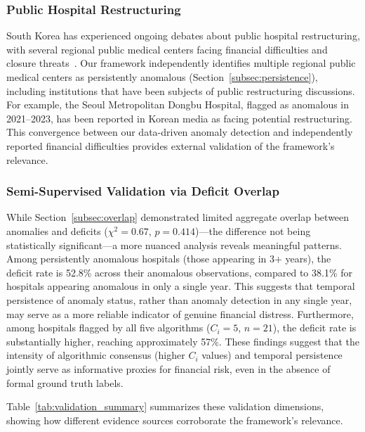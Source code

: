 \documentclass{ieeeaccess}
\begin{document}
\subsubsection{Public Hospital Restructuring}
South Korea has experienced ongoing debates about public hospital restructuring, with several regional public medical centers facing financial difficulties and closure threats~\cite{yeo2018closure}. Our framework independently identifies multiple regional public medical centers as persistently anomalous (Section~\ref{subsec:persistence}), including institutions that have been subjects of public restructuring discussions. For example, the Seoul Metropolitan Dongbu Hospital, flagged as anomalous in 2021--2023, has been reported in Korean media as facing potential restructuring. This convergence between our data-driven anomaly detection and independently reported financial difficulties provides external validation of the framework's relevance.

\subsubsection{Semi-Supervised Validation via Deficit Overlap}
While Section~\ref{subsec:overlap} demonstrated limited aggregate overlap between anomalies and deficits ($\chi^2 = 0.67$, $p = 0.414$)---the difference not being statistically significant---a more nuanced analysis reveals meaningful patterns. Among persistently anomalous hospitals (those appearing in 3+ years), the deficit rate is 52.8\% across their anomalous observations, compared to 38.1\% for hospitals appearing anomalous in only a single year. This suggests that temporal persistence of anomaly status, rather than anomaly detection in any single year, may serve as a more reliable indicator of genuine financial distress. Furthermore, among hospitals flagged by all five algorithms ($C_i = 5$, $n = 21$), the deficit rate is substantially higher, reaching approximately 57\%. These findings suggest that the intensity of algorithmic consensus (higher $C_i$ values) and temporal persistence jointly serve as informative proxies for financial risk, even in the absence of formal ground truth labels.

Table~\ref{tab:validation_summary} summarizes these validation dimensions, showing how different evidence sources corroborate the framework's relevance.
\end{document}
